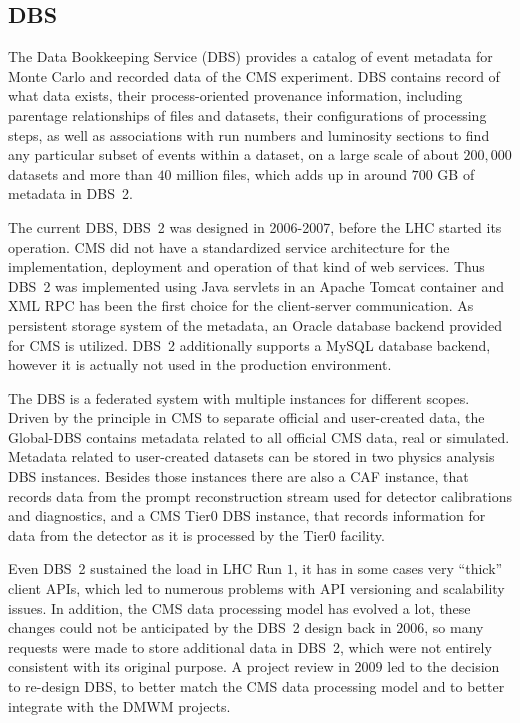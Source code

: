\subsection{DBS}
The Data Bookkeeping Service (DBS) \cite{DBS} provides a catalog of event metadata for Monte Carlo and recorded data of the CMS experiment. DBS contains record of what data exists, their process-oriented provenance information, including parentage relationships of files and datasets, their configurations of processing steps, as well as associations with run numbers and luminosity sections to find any particular subset of events within a dataset, on a large scale of about $200,000$ datasets and more than $40$ million files, which adds up in around $700$ GB of metadata in DBS~2.

The current DBS, DBS~2 \cite{DBS2} was designed in 2006-2007, before the LHC started its operation. CMS did not have a standardized service architecture for the implementation, deployment and operation of that kind of web services. Thus DBS~2 was implemented using Java servlets in an Apache Tomcat container and XML RPC has been the first choice for the client-server communication. As  persistent storage system of the metadata, an Oracle database backend provided for CMS \cite{CMSDBs} is utilized. DBS~2 additionally supports a MySQL database backend, however it is actually not used in the production environment.

The DBS is a federated system with multiple instances for different scopes. Driven by the principle in CMS to separate official and user-created data, the Global-DBS contains metadata related to all official CMS data, real or simulated. Metadata related to user-created datasets can be stored in two physics analysis DBS instances. Besides those instances there are also a CAF instance, that records data from the prompt reconstruction stream used for detector calibrations and diagnostics, and a CMS Tier0 DBS instance, that records information for data from the detector as it is processed by the Tier0 facility.

Even DBS~2 sustained the load in LHC Run $1$, it has in some cases very ``thick'' client APIs, which  led to numerous problems with API versioning and scalability issues. In addition, the CMS data processing model has evolved a lot, these changes could not be anticipated by the DBS~2 design back in $2006$, so many requests were made to store additional data in DBS~2, which were not entirely consistent with its original purpose. A project review in $2009$ led to the decision to re-design DBS, to better match the CMS data processing model and to better integrate with the DMWM projects.

